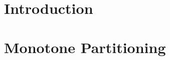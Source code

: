 



\section{Introduction\label{sec:partition_2_intro}}


\section{Monotone Partitioning\label{sec:partition_2_monotone}}


